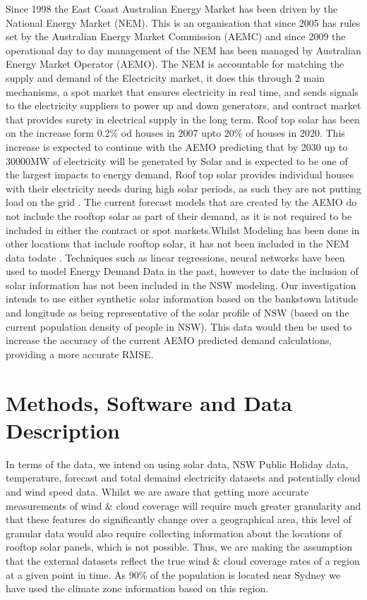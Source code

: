 \documentclass[mstat,12pt]{unswthesis}
\begin{document}
Since 1998 the East Coast Australian Energy Market has been driven by
the National Energy Market (NEM). This is an organisation that since
2005 has rules set by the Australian Energy Market Commission (AEMC) and
since 2009 the operational day to day management of the NEM has been
managed by Australian Energy Market Operator (AEMO). The NEM is
accountable for matching the supply and demand of the Electricity
market, it does this through 2 main mechanisms, a spot market that
ensures electricity in real time, and sends signals to the electricity
suppliers to power up and down generators, and contract market that
provides surety in electrical supply in the long term. Roof top solar
has been on the increase form 0.2\% od houses in 2007 upto 20\% of
houses in 2020. This increase is expected to continue with the AEMO
predicting that by 2030 up to 30000MW of electricity will be generated
by Solar \cite{aemo_2020_projections} and is expected to be one of the
largest impacts to energy demand, Roof top solar provides individual
houses with their electricity needs during high solar periods, as such
they are not putting load on the grid \cite{parkinson_2019_rooftop} .
The current forecast models that are created by the AEMO do not include
the rooftop solar as part of their demand, as it is not required to be
included in either the contract or spot markets.Whilst Modeling has been
done in other locations that include rooftop solar, it has not been
included in the NEM data todate \cite{aemo_electicity}. Techniques such
as linear regressions, neural networks have been used to model Energy
Demand Data in the past\cite{marcjasz_2008_neural}, however to date the
inclusion of solar information has not been included in the NSW
modeling\cite{nem_2021_mms}. Our investigation intends to use either
synthetic solar information based on the bankstown latitude and
longitude as being representative of the solar profile of NSW (based on
the current population density of people in NSW). This data would then
be used to increase the accuracy of the current AEMO predicted demand
calculations, providing a more accurate RMSE.

\hypertarget{methods-software-and-data-description}{%
\section{Methods, Software and Data
Description}\label{methods-software-and-data-description}}

In terms of the data, we intend on using solar data, NSW Public Holiday
data, temperature, forecast and total demaind electricity datasets and
potentially cloud and wind speed data. Whilst we are aware that getting
more accurate measurements of wind \& cloud coverage will require much
greater granularity and that these features do significantly change over
a geographical area, this level of granular data would also require
collecting information about the locations of rooftop solar panels,
which is not possible. Thus, we are making the assumption that the
external datasets reflect the true wind \& cloud coverage rates of a
region at a given point in time. As 90\% of the population is located
near Sydney we have used the climate zone information based on this
region\cite{abcb_2015_climate}.
\end{document}
